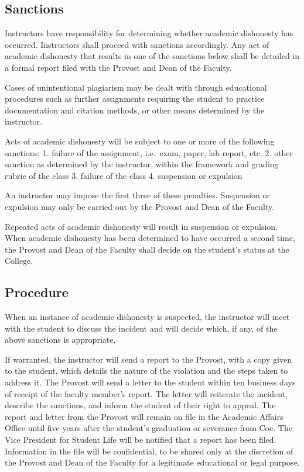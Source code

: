 \documentclass[
  letterpaper,
]{scrbook}
\begin{document}
\subsection{Sanctions}\label{sanctions}

Instructors have responsibility for determining whether academic
dishonesty has occurred. Instructors shall proceed with sanctions
accordingly. Any act of academic dishonesty that results in one of the
sanctions below shall be detailed in a formal report filed with the
Provost and Dean of the Faculty.

Cases of unintentional plagiarism may be dealt with through educational
procedures such as further assignments requiring the student to practice
documentation and citation methods, or other means determined by the
instructor.

Acts of academic dishonesty will be subject to one or more of the
following sanctions: 1. failure of the assignment, i.e.~exam, paper, lab
report, etc. 2. other sanction as determined by the instructor, within
the framework and grading rubric of the class 3. failure of the class 4.
suspension or expulsion

An instructor may impose the first three of these penalties. Suspension
or expulsion may only be carried out by the Provost and Dean of the
Faculty.

Repeated acts of academic dishonesty will result in suspension or
expulsion. When academic dishonesty has been determined to have occurred
a second time, the Provost and Dean of the Faculty shall decide on the
student's status at the College.

\subsection{Procedure}\label{procedure}

When an instance of academic dishonesty is suspected, the instructor
will meet with the student to discuss the incident and will decide
which, if any, of the above sanctions is appropriate.

If warranted, the instructor will send a report to the Provost, with a
copy given to the student, which details the nature of the violation and
the steps taken to address it. The Provost will send a letter to the
student within ten business days of receipt of the faculty member's
report. The letter will reiterate the incident, describe the sanctions,
and inform the student of their right to appeal. The report and letter
from the Provost will remain on file in the Academic Affairs Office
until five years after the student's graduation or severance from Coe.
The Vice President for Student Life will be notified that a report has
been filed. Information in the file will be confidential, to be shared
only at the discretion of the Provost and Dean of the Faculty for a
legitimate educational or legal purpose.
\end{document}
